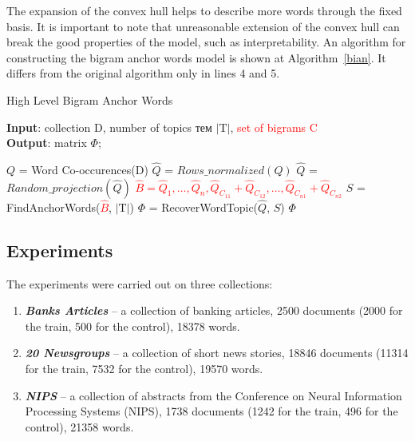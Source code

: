 \documentclass[runningheads,a4paper]{llncs}
\begin{document}
	The expansion of the convex hull helps to describe more words through the fixed basis. It is important to note that unreasonable extension of the convex hull can break the good properties of the model, such as interpretability. An algorithm for constructing the bigram anchor words model is shown at Algorithm~\ref{bian}. It differs from  the original algorithm only in lines 4 and 5.
	
	\begin{singlespacing}
		\begin{algorithm}
			\caption{High Level Bigram Anchor Words}
			\label{bian}
			\textbf{Input}: collection $\textrm{D}$, number of topics тем $|\textrm{T}|$, \textcolor{red}{set of bigrams $\textrm{C}$}\\
			\textbf{Output}: matrix $\Phi$; 
			\begin{algorithmic}[1]
				\State $Q$ = Word Co-occurences($\textrm{D}$)
				\State $\hat{Q}$ = $Rows\_normalized(Q)$
				\State $\hat{Q}$ = $Random\_projection(\hat{Q})$
				\State \textcolor{red}{$\hat{B} = {\hat{Q}_{1}, \dots, \hat{Q}_{n}, \hat{Q}_{C_{11}} + \hat{Q}_{C_{12}}, \dots, \hat{Q}_{C_{n1}} + \hat{Q}_{C_{n2}}}$}
				\State $S$ = FindAnchorWords(\textcolor{red}{$\hat{B}$}, $|\textrm{T}|$)
				\State $\Phi$ = RecoverWordTopic($\hat{Q}$, $S$)
				\State \Return $\Phi$
			\end{algorithmic}
		\end{algorithm}
	\end{singlespacing} 
	
	\subsection{Experiments} 
    
    The experiments were carried out on three collections:
    \begin{enumerate}
	 	\item \textit{\textbf{Banks Articles}} -- a collection of banking articles, 2500 documents (2000 for the train, 500 for the control), 18378 words.
    	\item \textit{\textbf{20 Newsgroups}} -- a collection of short news stories, 18846 documents (11314 for the train, 7532 for the control), 19570 words.
    	\item \textit{\textbf{NIPS}} -- a collection of abstracts from the Conference on Neural Information Processing Systems (NIPS), 1738 documents (1242 for the train, 496 for the control), 21358 words.
	\end{enumerate}
	
\end{document}
